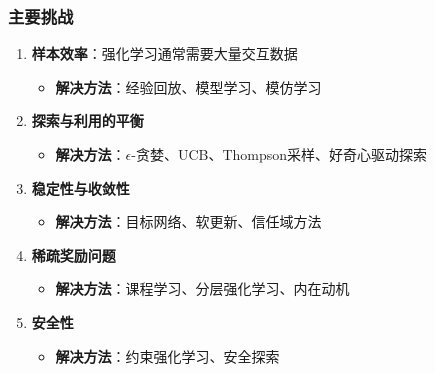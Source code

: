 \subsubsection{主要挑战}
\begin{enumerate}
    \item \textbf{样本效率}：强化学习通常需要大量交互数据
    \begin{itemize}
        \item \textbf{解决方法}：经验回放、模型学习、模仿学习
    \end{itemize}
    
    \item \textbf{探索与利用的平衡}
    \begin{itemize}
        \item \textbf{解决方法}：$\epsilon$-贪婪、UCB、Thompson采样、好奇心驱动探索
    \end{itemize}
    
    \item \textbf{稳定性与收敛性}
    \begin{itemize}
        \item \textbf{解决方法}：目标网络、软更新、信任域方法
    \end{itemize}
    
    \item \textbf{稀疏奖励问题}
    \begin{itemize}
        \item \textbf{解决方法}：课程学习、分层强化学习、内在动机
    \end{itemize}
    
    \item \textbf{安全性}
    \begin{itemize}
        \item \textbf{解决方法}：约束强化学习、安全探索
    \end{itemize}
\end{enumerate}

